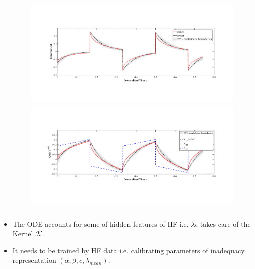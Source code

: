 \documentclass[10pt,xcolor=dvipsnames,compress]{beamer}
\begin{document}
\begin{frame}
\begin{columns}
\begin{column}{.42\textwidth}
\end{column}
\begin{column}{.59\textwidth}
\begin{center}
\begin{figure}[h]
    \centering
    \includegraphics[trim = 1.3in 2.2in 1.6in 2.8in, clip, width=1\textwidth]{figs/error_bound.png} 
        \\
    \includegraphics[trim = 1.3in 2.2in 1.6in 2.8in, clip, width=1\textwidth]{figs/V_bound.png} 
\end{figure}
\end{center}
\end{column}
\end{columns}
\begin{block}{}
\begin{itemize}
\item The ODE accounts for some of hidden features of HF i.e. $\lambda\epsilon$ takes care of the Kernel $\mathcal{K}$.
\item It needs to be trained by HF data i.e. calibrating parameters of inadequacy representation $(\alpha, \beta, c, \lambda_{mean})$. 
\end{itemize}
\end{block}


\vfill
\end{frame}
\end{document}
